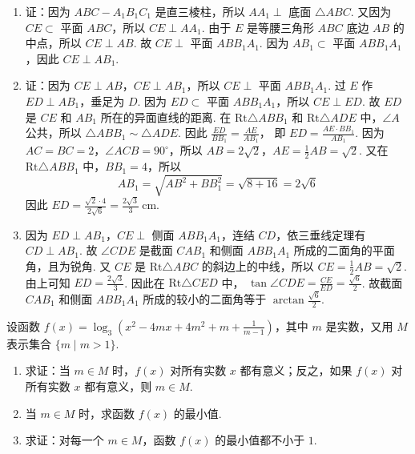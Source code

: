 \documentclass[UTF8,a4paper,oneside,11pt]{ctexbook}
\begin{document}
\begin{solution}
\begin{enumerate}
\item 证：因为 \(ABC-A_1B_1C_1\) 是直三棱柱，所以 \(AA_{1}\perp\) 底面 \(\triangle ABC\). 又因为 \(CE \subset\) 平面 \(ABC\)，所以 \(CE \perp AA_{1}\). 由于 \(E\) 是等腰三角形 \(ABC\) 底边 \(AB\) 的中点，所以 \(CE \perp AB\). 故 \(CE \perp\) 平面 \(ABB_1A_1\). 因为 \(AB_1 \subset\) 平面 \(ABB_1A_1\)，因此 \(CE \perp AB_1\).

\item 证：因为 \(CE \perp AB\)，\(CE \perp AB_{1}\)，所以 \(CE \perp\) 平面 \(ABB_{1}A_{1}\). 过 \(E\) 作 \(ED \perp AB_1\)，垂足为 \(D\). 因为 \(ED \subset\) 平面 \(ABB_1A_1\)，所以 \(CE \perp ED\). 故 \(ED\) 是 \(CE\) 和 \(AB_{1}\) 所在的异面直线的距离.
在 \(\mathrm{Rt}\triangle ABB_1\) 和 \(\mathrm{Rt}\triangle ADE\) 中，\(\angle A\) 公共，所以 \(\triangle ABB_1 \sim \triangle ADE\). 因此
\(\frac{ED}{BB_1} = \frac{AE}{AB_1}\)，
即
\(ED = \frac{AE \cdot BB_1}{AB_1}\).
因为 \(AC=BC=2\)，\(\angle ACB=90^{\circ}\)，所以 \(AB=2\sqrt{2}\)，\(AE=\frac{1}{2}AB=\sqrt{2}\).
又在 \(\mathrm{Rt}\triangle ABB_1\) 中，\(BB_1 = 4\)，所以
\[
AB_1 = \sqrt{AB^2 + BB_1^2} = \sqrt{8 + 16} = 2\sqrt{6}
\]
因此
\(ED=\frac{\sqrt{2}\cdot 4}{2\sqrt{6}}=\frac{2\sqrt{3}}{3}\mathrm{~cm}\).

\item 因为 \(ED\perp AB_1\)，\(CE\perp\) 侧面 \(ABB_1A_1\)，连结 \(CD\)，依三垂线定理有 \(CD\perp AB_1\). 故 \(\angle CDE\) 是截面 \(CAB_1\) 和侧面 \(ABB_1A_1\) 所成的二面角的平面角，且为锐角. 又 \(CE\) 是 \(\mathrm{Rt}\triangle ABC\) 的斜边上的中线，所以 \(CE=\frac{1}{2}AB=\sqrt{2}\). 由上可知 \(ED=\frac{2\sqrt{3}}{3}\). 因此在 \(\mathrm{Rt}\triangle CED\) 中，
\(\tan\angle CDE=\frac{CE}{ED}=\frac{\sqrt{6}}{2}\).
故截面 \(CAB_{1}\) 和侧面 \(ABB_{1}A_{1}\) 所成的较小的二面角等于 \(\arctan\frac{\sqrt{6}}{2}\).
\end{enumerate}
\end{solution}

\begin{problem}

设函数 \(f(x)=\log_{3}\left(x^{2}-4mx+4m^{2}+m+\frac{1}{m-1}\right) \)，其中 \(m\) 是实数，又用 \(M\) 表示集合 \(\{m \mid m>1\} \).

\begin{enumerate}
\item 求证：当 \(m \in M \) 时，\(f(x)\) 对所有实数 \(x\) 都有意义；反之，如果 \(f(x)\) 对所有实数 \(x\) 都有意义，则 \(m \in M\).
\item 当 \(m \in M \) 时，求函数 \(f(x)\) 的最小值.
\item 求证：对每一个 \(m \in M \)，函数 \(f(x)\) 的最小值都不小于 \(1\).
\end{enumerate}
\end{problem}
\end{document}
